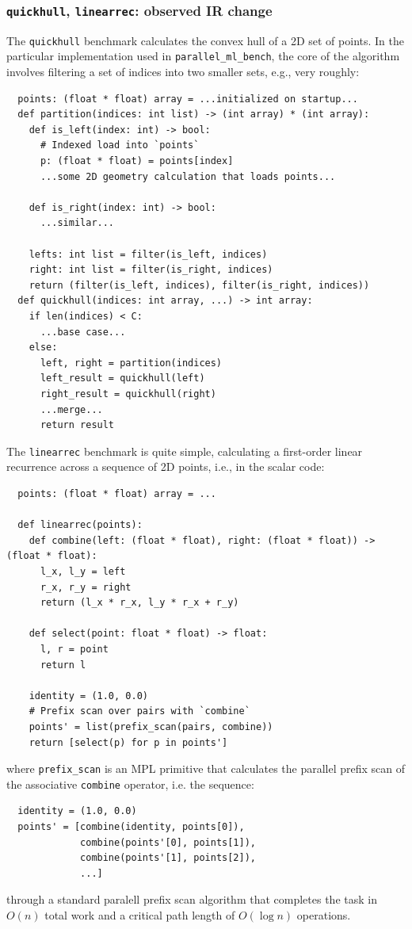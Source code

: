 \documentclass[leqno,11pt]{article}
\begin{document}
\subsubsection{\texttt{quickhull}, \texttt{linearrec}: observed IR change}
The \texttt{quickhull} benchmark calculates the convex hull of a 2D set of
points. In the particular implementation used in \texttt{parallel\_ml\_bench},
the core of the algorithm involves filtering a set of indices into two smaller
sets, e.g., very roughly:
\begin{verbatim}
  points: (float * float) array = ...initialized on startup...
  def partition(indices: int list) -> (int array) * (int array):
    def is_left(index: int) -> bool:
      # Indexed load into `points`
      p: (float * float) = points[index]
      ...some 2D geometry calculation that loads points...

    def is_right(index: int) -> bool:
      ...similar...

    lefts: int list = filter(is_left, indices)
    right: int list = filter(is_right, indices)
    return (filter(is_left, indices), filter(is_right, indices))
  def quickhull(indices: int array, ...) -> int array:
    if len(indices) < C:
      ...base case...
    else:
      left, right = partition(indices)
      left_result = quickhull(left)
      right_result = quickhull(right)
      ...merge...
      return result
\end{verbatim}

The \texttt{linearrec} benchmark is quite simple, calculating a first-order
linear recurrence across a sequence of 2D points, i.e., in the scalar code:
\begin{verbatim}
  points: (float * float) array = ...

  def linearrec(points):
    def combine(left: (float * float), right: (float * float)) -> (float * float):
      l_x, l_y = left
      r_x, r_y = right
      return (l_x * r_x, l_y * r_x + r_y)

    def select(point: float * float) -> float:
      l, r = point
      return l

    identity = (1.0, 0.0)
    # Prefix scan over pairs with `combine`
    points' = list(prefix_scan(pairs, combine))
    return [select(p) for p in points']
\end{verbatim}
where \texttt{prefix\_scan} is an MPL primitive that calculates the parallel
prefix scan of the associative \texttt{combine} operator, i.e. the sequence:
\begin{verbatim}
  identity = (1.0, 0.0)
  points' = [combine(identity, points[0]),
             combine(points'[0], points[1]),
             combine(points'[1], points[2]),
             ...]
\end{verbatim}
through a standard paralell prefix scan algorithm that completes the task in
$O(n)$ total work and a critical path length of $O(\log n)$ operations.
\end{document}
